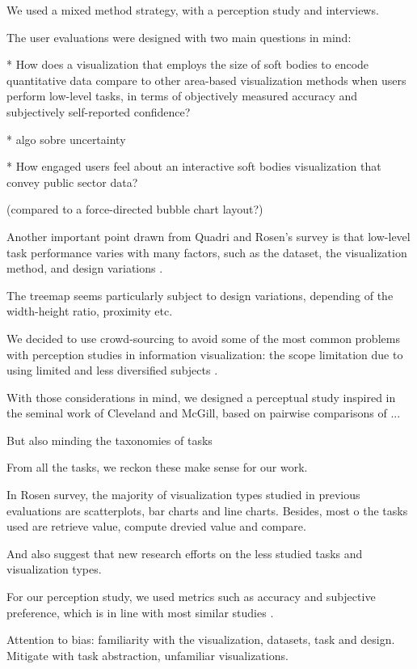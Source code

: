 \documentclass[manuscript, screen]{timtm}
\begin{document}
We used a mixed method strategy, with a perception study and interviews.

The user evaluations were designed with two main questions in mind:

* How does a visualization that employs the size of soft bodies to encode quantitative data compare to other area-based visualization methods when users perform low-level tasks, in terms of objectively measured accuracy and subjectively self-reported confidence?

* algo sobre uncertainty

* How engaged users feel about an interactive soft bodies visualization that convey public sector data?

(compared to a force-directed bubble chart layout?)



Another important point drawn from Quadri and Rosen's survey is that low-level task performance varies with many factors, such as the dataset, the visualization method, and design variations \cite{QuadriGhulamJilani2022ASoP}.

The treemap seems particularly subject to design variations, depending of the width-height ratio, proximity etc.

We decided to use crowd-sourcing to avoid some of the most common problems with perception studies in information visualization: the scope limitation due to using limited and less diversified subjects \cite{QuadriGhulamJilani2022ASoP}.

With those considerations in mind, we designed a perceptual study inspired in the seminal work of Cleveland and McGill, based on pairwise comparisons of ...

But also minding the taxonomies of tasks

From all the tasks, we reckon these make sense for our work.

In Rosen survey, the majority of visualization types studied in previous evaluations are scatterplots, bar charts and line charts. Besides, most o the tasks used are retrieve value, compute drevied value and compare.

And also \cite{QuadriGhulamJilani2022ASoP} suggest that new research efforts on the less studied tasks and visualization types.

For our perception study, we used metrics such as accuracy and subjective preference, which is in line with most similar studies \cite{QuadriGhulamJilani2022ASoP}.

Attention to bias: familiarity with the visualization, datasets, task and design. Mitigate with task abstraction, unfamiliar visualizations.
\end{document}
